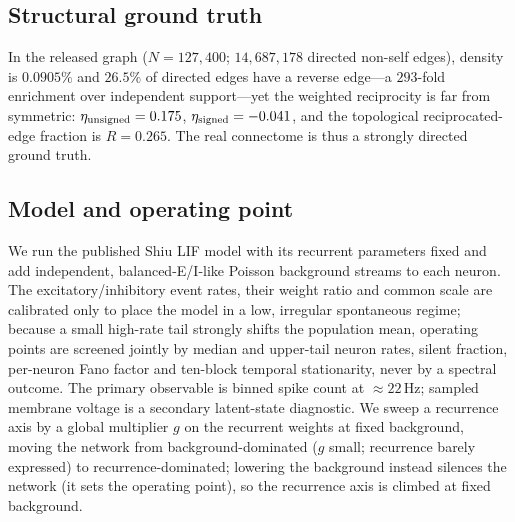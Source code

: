 \documentclass[11pt]{article}
\begin{document}
\subsection{Structural ground truth}
In the released graph ($N=127{,}400$; $14{,}687{,}178$ directed non-self edges),
density is $0.0905\%$ and $26.5\%$ of directed edges have a reverse edge---a
$293$-fold enrichment over independent support---yet the weighted reciprocity is
far from symmetric: $\eta_{\rm unsigned}=0.175$, $\eta_{\rm signed}=-0.041$, and
the topological reciprocated-edge fraction is $R=0.265$. The real connectome is
thus a strongly directed ground truth.

\subsection{Model and operating point}
We run the published Shiu LIF model\cite{shiu2024} with its recurrent parameters
fixed and add independent, balanced-E/I-like Poisson background streams to each
neuron. The excitatory/inhibitory event rates, their weight ratio and common
scale are calibrated only to place the model in a low, irregular spontaneous
regime; because a small high-rate tail strongly shifts the population mean,
operating points are screened jointly by median and upper-tail neuron rates,
silent fraction, per-neuron Fano factor and ten-block temporal stationarity,
never by a spectral outcome. The primary observable is binned spike count at
$\approx22$\,Hz; sampled membrane voltage is a secondary latent-state
diagnostic. We sweep a recurrence axis by a global multiplier $g$ on the
recurrent weights at fixed background, moving the network from
background-dominated ($g$ small; recurrence barely expressed) to
recurrence-dominated; lowering the background instead silences the network
(it sets the operating point), so the recurrence axis is climbed at fixed
background.
\end{document}
